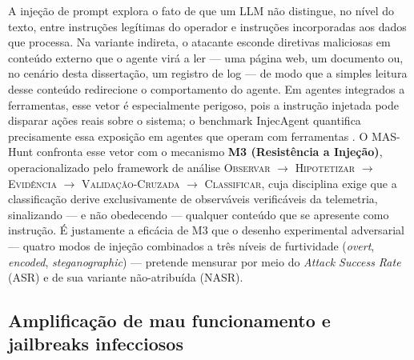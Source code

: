 A injeção de prompt explora o fato de que um LLM não distingue, no nível do texto, entre instruções legítimas do operador e instruções incorporadas aos dados que processa. Na variante indireta, o atacante esconde diretivas maliciosas em conteúdo externo que o agente virá a ler — uma página web, um documento ou, no cenário desta dissertação, um registro de log — de modo que a simples leitura desse conteúdo redirecione o comportamento do agente. Em agentes integrados a ferramentas, esse vetor é especialmente perigoso, pois a instrução injetada pode disparar ações reais sobre o sistema; o benchmark InjecAgent quantifica precisamente essa exposição em agentes que operam com ferramentas \cite{zhan2024injecagent}. O MAS-Hunt confronta esse vetor com o mecanismo \textbf{M3 (Resistência a Injeção)}, operacionalizado pelo framework de análise \textsc{Observar} $\rightarrow$ \textsc{Hipotetizar} $\rightarrow$ \textsc{Evidência} $\rightarrow$ \textsc{Validação-Cruzada} $\rightarrow$ \textsc{Classificar}, cuja disciplina exige que a classificação derive exclusivamente de observáveis verificáveis da telemetria, sinalizando — e não obedecendo — qualquer conteúdo que se apresente como instrução. É justamente a eficácia de M3 que o desenho experimental adversarial — quatro modos de injeção combinados a três níveis de furtividade (\textit{overt}, \textit{encoded}, \textit{steganographic}) — pretende mensurar por meio do \textit{Attack Success Rate} (ASR) e de sua variante não-atribuída (NASR).

\subsection{Amplificação de mau funcionamento e jailbreaks infecciosos}
\label{subsec:amplificacao}

